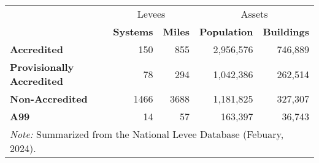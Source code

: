 \begin{table}[!h]
\centering
\begin{tabular}{>{}l|r|r|r|r}
\hline
\multicolumn{1}{c|}{ } & \multicolumn{2}{c|}{Levees} & \multicolumn{2}{c}{Assets} \\
\cline{2-3} \cline{4-5}
\textbf{} & \textbf{Systems} & \textbf{Miles} & \textbf{Population} & \textbf{Buildings}\\
\hline
\textbf{Accredited} & 150 & 855 & 2,956,576 & 746,889\\
\hline
\textbf{Provisionally Accredited} & 78 & 294 & 1,042,386 & 262,514\\
\hline
\textbf{Non-Accredited} & 1466 & 3688 & 1,181,825 & 327,307\\
\hline
\textbf{A99} & 14 & 57 & 163,397 & 36,743\\
\hline
\multicolumn{5}{l}{\rule{0pt}{1em}\textit{Note: } Summarized from the National Levee Database (Febuary, 2024).}\\
\end{tabular}
\end{table}
